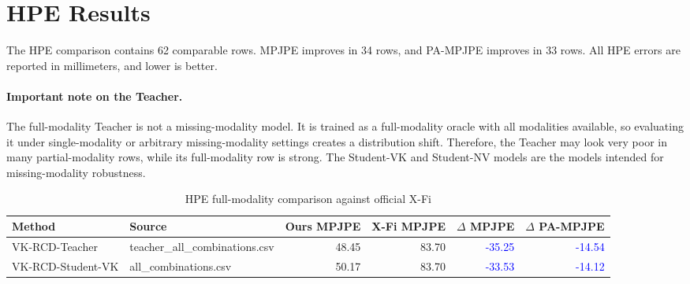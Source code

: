 \section{HPE Results}
The HPE comparison contains 62 comparable rows. MPJPE improves in 34 rows, and PA-MPJPE improves in 33 rows. All HPE errors are reported in millimeters, and lower is better.
\paragraph{Important note on the Teacher.} The full-modality Teacher is not a missing-modality model. It is trained as a full-modality oracle with all modalities available, so evaluating it under single-modality or arbitrary missing-modality settings creates a distribution shift. Therefore, the Teacher may look very poor in many partial-modality rows, while its full-modality row is strong. The Student-VK and Student-NV models are the models intended for missing-modality robustness.
\begin{table}[htbp]\centering\caption{HPE full-modality comparison against official X-Fi}\begin{tabular}{llrrrr}\toprule
Method & Source & Ours MPJPE & X-Fi MPJPE & $\Delta$ MPJPE & $\Delta$ PA-MPJPE\\\midrule
VK-RCD-Teacher & teacher\_all\_combinations.csv & 48.45 & 83.70 & \textcolor{blue}{-35.25} & \textcolor{blue}{-14.54}\\
VK-RCD-Student-VK & all\_combinations.csv & 50.17 & 83.70 & \textcolor{blue}{-33.53} & \textcolor{blue}{-14.12}\\
\bottomrule\end{tabular}\end{table}
